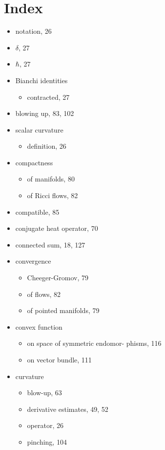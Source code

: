 \chapter*{Index}

\begin{itemize}
\item notation, 26
\item $\delta$, 27
\item $\hbar$, 27
\item Bianchi identities
\begin{itemize}
\item contracted, 27
\end{itemize}
\item blowing up, 83, 102
\item scalar curvature
\begin{itemize}
\item definition, 26
\end{itemize}
\item compactness
\begin{itemize}
\item of manifolds, 80
\item of Ricci flows, 82
\end{itemize}
\item compatible, 85
\item conjugate heat operator, 70
\item connected sum, 18, 127
\item convergence
\begin{itemize}
\item Cheeger-Gromov, 79
\item of flows, 82
\item of pointed manifolds, 79
\end{itemize}
\item convex function
\begin{itemize}
\item on space of symmetric endomor-
    phisms, 116
\item on vector bundle, 111
\end{itemize}
\item curvature
\begin{itemize}
\item blow-up, 63
\item derivative estimates, 49, 52
\item operator, 26
\item pinching, 104

\end{itemize}
\end{itemize}
